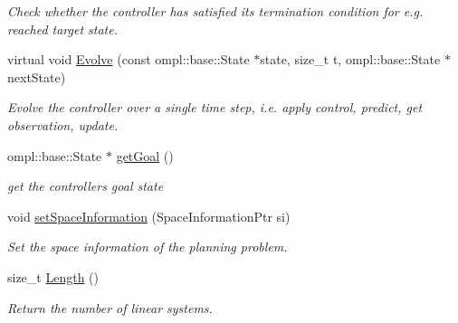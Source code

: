 \begin{DoxyCompactItemize}
\begin{DoxyCompactList}\small\item\em \-Check whether the controller has satisfied its termination condition for e.\-g. reached target state. \end{DoxyCompactList}\item 
\hypertarget{class_controller_a64c3c47732f138326490303858133ae7}{virtual void \hyperlink{class_controller_a64c3c47732f138326490303858133ae7}{\-Evolve} (const ompl\-::base\-::\-State $\ast$state, size\-\_\-t t, ompl\-::base\-::\-State $\ast$next\-State)}\label{class_controller_a64c3c47732f138326490303858133ae7}

\begin{DoxyCompactList}\small\item\em \-Evolve the controller over a single time step, i.\-e. apply control, predict, get observation, update. \end{DoxyCompactList}\item 
\hypertarget{class_controller_a848b1e5a3dc6d36c3ede121b7461d896}{ompl\-::base\-::\-State $\ast$ \hyperlink{class_controller_a848b1e5a3dc6d36c3ede121b7461d896}{get\-Goal} ()}\label{class_controller_a848b1e5a3dc6d36c3ede121b7461d896}

\begin{DoxyCompactList}\small\item\em get the controllers goal state \end{DoxyCompactList}\item 
\hypertarget{class_controller_ac0b9c339df7157c73d61b7064f88483c}{void \hyperlink{class_controller_ac0b9c339df7157c73d61b7064f88483c}{set\-Space\-Information} (\-Space\-Information\-Ptr si)}\label{class_controller_ac0b9c339df7157c73d61b7064f88483c}

\begin{DoxyCompactList}\small\item\em \-Set the space information of the planning problem. \end{DoxyCompactList}\item 
\hypertarget{class_controller_a2aa89a4cd76ba7fb6ad717d608b8c355}{size\-\_\-t \hyperlink{class_controller_a2aa89a4cd76ba7fb6ad717d608b8c355}{\-Length} ()}\label{class_controller_a2aa89a4cd76ba7fb6ad717d608b8c355}

\begin{DoxyCompactList}\small\item\em \-Return the number of linear systems. \end{DoxyCompactList}\end{DoxyCompactItemize}
